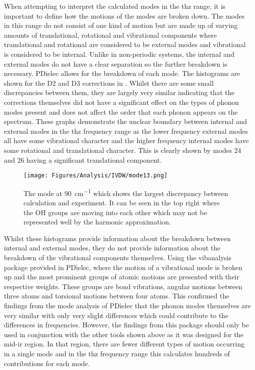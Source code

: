 When attempting to interpret the calculated modes in the \acrshort{thz} range, it is important to define how the motions of the modes are broken down. The modes in this range do not consist of one kind of motion but are made up of varying amounts of translational, rotational and vibrational components where translational and rotational are considered to be external modes and vibrational is considered to be internal. Unlike in non-periodic systems, the internal and external modes do not have a clear separation \DIFdelbegin \DIFdel{~}\DIFdelend \cite{Jepsen2007} so the further breakdown is necessary. PDielec allows for the breakdown of each mode. The histograms are shown for the D2 and D3 corrections in . Whilst there are some small discrepancies between them, they are largely very similar indicating that the corrections themselves did not have a significant effect on the types of phonon modes present and does not affect the order that each phonon appears on the spectrum. These graphs demonstrate the unclear boundary between internal and external modes in the \acrshort{thz} frequency range as the lower frequency external modes all have some vibrational character and the higher frequency internal modes have some rotational and translational character. This is clearly shown by modes 24 and 26 having a significant translational component.

\begin{figure}[t]
    \centering
    \texttt{[image: Figures/Analysis/IVDW/mode13.png]}
    \captionsetup{font = footnotesize, justification = centering}
    \caption[The Mode which shows the Largest Discrepancy between Calculation and Experiment]{The mode at \SI{90}{cm^{-1}} which shows the largest discrepancy between calculation and experiment. It can be seen in the top right where the OH groups are moving into each other which may not be represented well by the harmonic approximation.}
    \label{fig:mode13_anharm}
\end{figure}

Whilst these histograms provide information about the breakdown between internal and external modes, they do not provide information about the breakdown of the vibrational components themselves. Using the vibanalysis \DIFdelbegin \DIFdel{~}\DIFdelend \cite{Teixeira2018VMARD} package provided in PDielec, where the motion of a vibrational mode is broken up and the most prominent groups of atomic motions are presented with their respective weights. These groups are bond vibrations, angular motions between three atoms and torsional motions between four atoms. This confirmed the findings from the mode analysis of PDielec that the phonon modes themselves are very similar with only very slight differences which could contribute to the differences in frequencies. However, the findings from this package should only be used in conjunction with the other tools shown above as it was designed for the mid\nobreakdash-\acrshort{ir} region. In that region, there are fewer different types of motion occurring in a single mode and in the \acrshort{thz} frequency range this calculates hundreds of contributions for each mode. 

